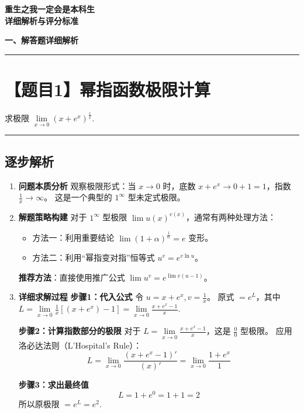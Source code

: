 \documentclass[12pt, a4paper]{article}
\newenvironment{redenv}{\color{red}}{}
\newenvironment{detailedanalysis}{%
    \color{red}
    \begin{enumerate}[label=\textbf{第\arabic*步：}, leftmargin=*, align=left, itemsep=1.5ex]
}{%
    \end{enumerate}
}
\newcommand{\problemrule}{\noindent\rule{\textwidth}{1.5pt}\vspace{-0.8em}}
\newcommand{\analysisrule}{\noindent\rule{\textwidth}{0.8pt}\vspace{-0.8em}}
\begin{document}
\begin{center}
    \textbf{\Large 重生之我一定会是本科生} \\[0.5em]
    \large \textbf{详细解析与评分标准}
\end{center}

\vspace{1em}

\noindent \textbf{一、解答题详细解析}

\problemrule
\section*{【题目1】幂指函数极限计算}
求极限 $\lim\limits_{x \to 0} (x + e^x)^{\frac{1}{x}}$.

\begin{redenv}
\analysisrule
\subsection*{逐步解析}

\begin{detailedanalysis}
\item \textbf{问题本质分析}
观察极限形式：当 $x \to 0$ 时，底数 $x + e^x \to 0 + 1 = 1$，指数 $\frac{1}{x} \to \infty$。
这是一个典型的 $1^\infty$ 型未定式极限。

\item \textbf{解题策略构建}
对于 $1^\infty$ 型极限 $\lim u(x)^{v(x)}$，通常有两种处理方法：
\begin{itemize}
    \item 方法一：利用重要结论 $\lim (1+\alpha)^{\frac{1}{\alpha}} = e$ 变形。
    \item 方法二：利用“幂指变对指”恒等式 $u^v = e^{v \ln u}$。
\end{itemize}
\textbf{推荐方法}：直接使用推广公式 $\lim u^v = e^{\lim v(u-1)}$。

\item \textbf{详细求解过程}
\textbf{步骤1：代入公式}
令 $u = x + e^x, v = \frac{1}{x}$。
原式 $= e^L$，其中 $L = \lim\limits_{x \to 0} \frac{1}{x} [(x + e^x) - 1] = \lim\limits_{x \to 0} \frac{x + e^x - 1}{x}$.

\textbf{步骤2：计算指数部分的极限}
对于 $L = \lim\limits_{x \to 0} \frac{x + e^x - 1}{x}$，这是 $\frac{0}{0}$ 型极限。
应用洛必达法则（L'Hospital's Rule）：
\[
L = \lim\limits_{x \to 0} \frac{(x + e^x - 1)'}{(x)'} = \lim\limits_{x \to 0} \frac{1 + e^x}{1}
\]

\textbf{步骤3：求出最终值}
\[
L = 1 + e^0 = 1 + 1 = 2
\]
所以原极限 $= e^L = e^2$.


\end{detailedanalysis}
\end{redenv}
\end{document}
